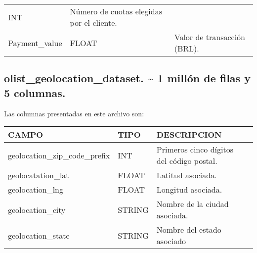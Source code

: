 \documentclass[11pt]{article}
\begin{document}
\begin{longtable}[]{@{}lll@{}}
\begin{minipage}[t]{0.30\columnwidth}
INT\strut
\end{minipage} & \begin{minipage}[t]{0.30\columnwidth}\raggedright
Número de cuotas elegidas por el cliente.\strut
\end{minipage}\tabularnewline
\begin{minipage}[t]{0.30\columnwidth}\raggedright
Payment\_value\strut
\end{minipage} & \begin{minipage}[t]{0.30\columnwidth}\raggedright
FLOAT\strut
\end{minipage} & \begin{minipage}[t]{0.30\columnwidth}\raggedright
Valor de transacción (BRL).\strut
\end{minipage}\tabularnewline
\bottomrule
\end{longtable}

    \hypertarget{olist_geolocation_dataset.-1-milluxf3n-de-filas-y-5-columnas.}{%
\subsection{olist\_geolocation\_dataset. \textasciitilde{} 1 millón de
filas y 5
columnas.}\label{olist_geolocation_dataset.-1-milluxf3n-de-filas-y-5-columnas.}}

Las columnas presentadas en este archivo son:

\begin{longtable}[]{@{}llll@{}}
\toprule
CAMPO & TIPO & DESCRIPCION &\tabularnewline
\midrule
\endhead
geolocation\_zip\_code\_prefix & INT & Primeros cinco dígitos del código
postal. &\tabularnewline
geolocatation\_lat & FLOAT & Latitud asociada. &\tabularnewline
geolocation\_lng & FLOAT & Longitud asociada. &\tabularnewline
geolocation\_city & STRING & Nombre de la ciudad asociada.
&\tabularnewline
geolocation\_state & STRING & Nombre del estado asociado
&\tabularnewline
\bottomrule
\end{longtable}


    
    
    
    
\end{document}
